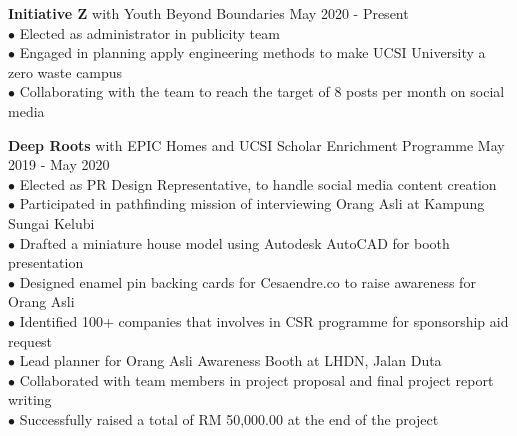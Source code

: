 \documentclass{article}
\begin{document}
\begin{addmargin}[2em]{0em}
{\bfseries Initiative Z} {\bfseries\textbar}\hspace{1pt} with Youth Beyond Boundaries \hfill \vspace{.5em} May 2020 - Present\\ 
{\tiny $\bullet$}\hspace{0.25em} 
Elected as administrator in publicity team\\
{\tiny $\bullet$}\hspace{0.25em} 
Engaged in planning apply engineering methods to make UCSI University a zero waste campus\\
{\tiny $\bullet$}\hspace{0.25em} 
Collaborating with the team to reach the target of 8 posts per month on social media\\
\end{addmargin}

\vspace{-.5em}

\begin{addmargin}[2em]{0em}
{\bfseries Deep Roots} {\bfseries\textbar}\hspace{1pt} with EPIC Homes and UCSI Scholar Enrichment Programme \hfill \vspace{.5em} May 2019 - May 2020\\ 
{\tiny $\bullet$}\hspace{0.25em} 
Elected as PR Design Representative, to handle social media content creation\\
{\tiny $\bullet$}\hspace{0.25em} 
Participated in pathfinding mission of interviewing Orang Asli at Kampung Sungai Kelubi\\
{\tiny $\bullet$}\hspace{0.25em} 
Drafted a miniature house model using Autodesk AutoCAD for booth presentation\\
{\tiny $\bullet$}\hspace{0.25em} 
Designed enamel pin backing cards for Cesaendre.co to raise awareness for Orang Asli\\
{\tiny $\bullet$}\hspace{0.25em} 
Identified 100+ companies that involves in CSR programme for sponsorship aid request\\
{\tiny $\bullet$}\hspace{0.25em} 
Lead planner for Orang Asli Awareness Booth at LHDN, Jalan Duta\\
{\tiny $\bullet$}\hspace{0.25em} 
Collaborated with team members in project proposal and final project report writing\\
{\tiny $\bullet$}\hspace{0.25em} 
Successfully raised a total of RM 50,000.00 at the end of the project

\end{addmargin}
\end{document}
